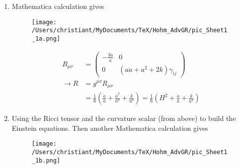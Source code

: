 \documentclass[10pt,a4paper]{article}
\theoremstyle{definition}
\begin{document}
\begin{enumerate}[1.]
\item Mathematica calculation gives
\begin{figure}[!h]
\centering
\texttt{[image: /Users/christiant/MyDocuments/TeX/Hohm\_AdvGR/pic\_Sheet1\_1a.png]}
\end{figure}

\begin{align}
R_{\mu\nu}
&=\left(
\begin{matrix}
-\frac{3\ddot{a}}{a} &0\\
0 &{(a\ddot{a}+a^2+2k)\gamma_{ij}}
\end{matrix}
\right)\\
\rightarrow R&=g^{\mu\nu}R_{\mu\nu}\\
&=\frac{1}{6}\left(\frac{\ddot{a}}{a}+\frac{\dot{a}^2}{a^2}+\frac{k}{a^2}\right)
=\frac{1}{6}\left(H^2+\frac{\ddot{a}}{a}+\frac{k}{a^2}\right)
\end{align}

\item Using the Ricci tensor and the curvature scalar (from above) to build the Einstein equations. Then another Mathematica calculation gives
\begin{figure}[!h]
\centering
\texttt{[image: /Users/christiant/MyDocuments/TeX/Hohm\_AdvGR/pic\_Sheet1\_1b.png]}
\end{figure}
\end{enumerate}
\end{document}
